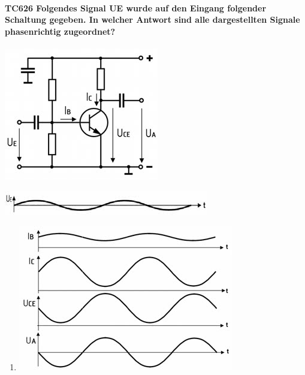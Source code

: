 \documentclass[8pt]{article}
\begin{document}
\begin{enumerate}
\begin{enumerate}[nolistsep,label=\Alph*]
{\begin{enumerate}[nolistsep,label=\Alph*]
\paragraph*{TC626 Folgendes Signal UE wurde auf den Eingang folgender Schaltung gegeben. In welcher Antwort sind alle dargestellten Signale phasenrichtig zugeordnet?}
\begin{center}
	\begin{minipage}{\linewidth}
		\centering
		\includegraphics[scale=1.0]{pics/tc626_a.jpg}
	\end{minipage}
\end{center}
\begin{center}
	\begin{minipage}{\linewidth}
		\centering
		\includegraphics[scale=1.0]{pics/tc626_b.jpg}
	\end{minipage}
\end{center}
\begin{enumerate}[nolistsep,label=\Alph*]
\item
	\begin{center}
		\begin{minipage}{\linewidth}
			\centering
			\includegraphics[scale=1.0]{pics/tc626_c.jpg}

\end{minipage}
\end{center}
\end{enumerate}
\end{enumerate}}
\end{enumerate}
\end{enumerate}
\end{document}
